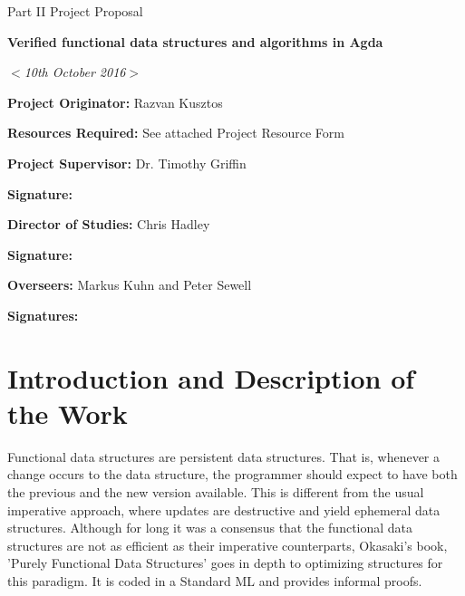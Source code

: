 \documentclass[12pt]{article}
\newcommand{\al}{$<$}
\newcommand{\ar}{$>$}
\begin{document}
\thispagestyle{empty}

\rightline{\large\al\emph{name}\ar}
\medskip
\rightline{\large\al\emph{College}\ar}
\medskip
\rightline{\large\al\emph{CRSID}\ar}

\vfil

\centerline{\large Part II Project Proposal}
\vspace{0.4in}
\centerline{\Large\bf Verified functional data structures and algorithms in Agda}
\vspace{0.3in}
\centerline{\large \al\emph{10th October 2016}\ar}

\vfil

{\bf Project Originator:} Razvan Kusztos

\vspace{0.1in}

{\bf Resources Required:} See attached Project Resource Form

\vspace{0.5in}

{\bf Project Supervisor:} Dr. Timothy Griffin

\vspace{0.2in}

{\bf Signature:}

\vspace{0.5in}

{\bf Director of Studies:}  Chris Hadley

\vspace{0.2in}

{\bf Signature:}

\vspace{0.5in}

{\bf Overseers:} Markus Kuhn and Peter Sewell

\vspace{0.2in}

{\bf Signatures:}

\vfil
\eject

\section*{Introduction and Description of the Work}


Functional data structures are persistent data structures. That is,
whenever a change occurs to the data structure, the programmer should expect to have
both the previous and the new version available. This is different from the usual
imperative approach, where updates are destructive and yield ephemeral data structures.
Although for long it was a consensus that the functional data structures are not
as efficient as their imperative counterparts, Okasaki's book, 'Purely Functional
Data Structures' goes in depth to optimizing structures for this paradigm.
It is coded in a Standard ML and provides informal proofs.
\end{document}
